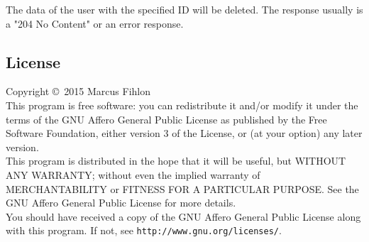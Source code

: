 \documentclass[a4paper,openright,twoside]{report}
\renewcommand{\listoffigures}{\begingroup
	\tocchapter
	\tocfile{\listfigurename}{lof}
\endgroup}
\renewcommand{\listoftables}{\begingroup
	\tocchapter
	\tocfile{\listtablename}{lot}
\endgroup}
\begin{document}
The data of the user with the specified ID will be deleted. The response usually is a "204 No Content" or an error response.

\begin{appendix}

\listoffigures

\listoftables

\chapter{License}
Copyright \copyright\ 2015 Marcus Fihlon
\\[0.25cm]
This program is free software: you can redistribute it and/or modify it under the terms of the GNU Affero General Public License as published by the Free Software Foundation, either version 3 of the License, or (at your option) any later version.
\\[0.25cm]
This program is distributed in the hope that it will be useful, but WITHOUT ANY WARRANTY; without even the implied warranty of MERCHANTABILITY or FITNESS FOR A PARTICULAR PURPOSE. See the GNU Affero General Public License for more details.
\\[0.25cm]
You should have received a copy of the GNU Affero General Public License along with this program. If not, see \texttt{http://www.gnu.org/licenses/}.

\end{appendix}
\end{document}
